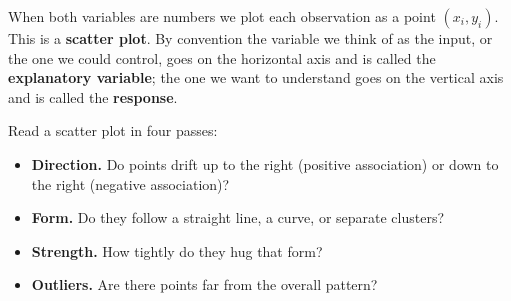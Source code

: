When both variables are numbers we plot each observation as a point $(x_i, y_i)$.
This is a \textbf{scatter plot}. By convention the variable we think of as the
input, or the one we could control, goes on the horizontal axis and is called the
\textbf{explanatory variable}; the one we want to understand goes on the
vertical axis and is called the \textbf{response}.

Read a scatter plot in four passes:
\begin{itemize}
  \item \textbf{Direction.} Do points drift up to the right (positive association) or
    down to the right (negative association)?
  \item \textbf{Form.} Do they follow a straight line, a curve, or separate clusters?
  \item \textbf{Strength.} How tightly do they hug that form?
  \item \textbf{Outliers.} Are there points far from the overall pattern?
\end{itemize}

